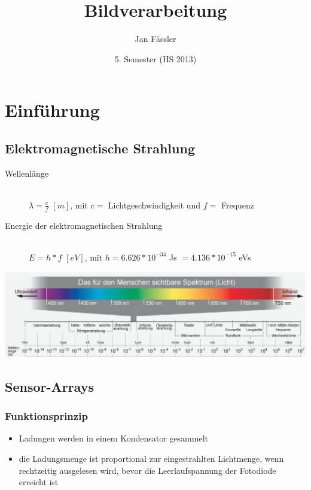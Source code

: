 \documentclass[10pt]{article}
\title{
	\vspace{5cm}
	Bildverarbeitung
}
\author{Jan Fässler}
\date{5. Semester (HS 2013)}
\begin{document}
\maketitle
\thispagestyle{fancy}

\newpage

\tableofcontents	  	

\newpage
\setcounter{page}{1}

\section{Einführung}
\subsection{Elektromagnetische Strahlung}
\begin{description}
	\item[Wellenlänge] \hfill \\
		$\lambda = \frac{c}{f}$ $[m]$, mit $c =$ Lichtgeschwindigkeit und $f =$ Frequenz
	\item[Energie der elektromagnetischen Strahlung] \hfill \\
		$E=h*f$ $[eV]$, mit $h=6.626*10^{-34}$ Js $= 4.136 * 10^{-15}$ eVs 
\end{description}
\begin{center}
	\includegraphics[scale=0.35]{lichtspektrum.png}
\end{center}

\subsection{Sensor-Arrays}
\subsubsection*{Funktionsprinzip}
\begin{itemize}
	\item Ladungen werden in einem Kondensator gesammelt
	\item die Ladungsmenge ist proportional zur eingestrahlten Lichtmenge, wenn rechtzeitig ausgelesen wird, bevor die Leerlaufspannung der Fotodiode erreicht ist
\end{itemize}
\end{document}
